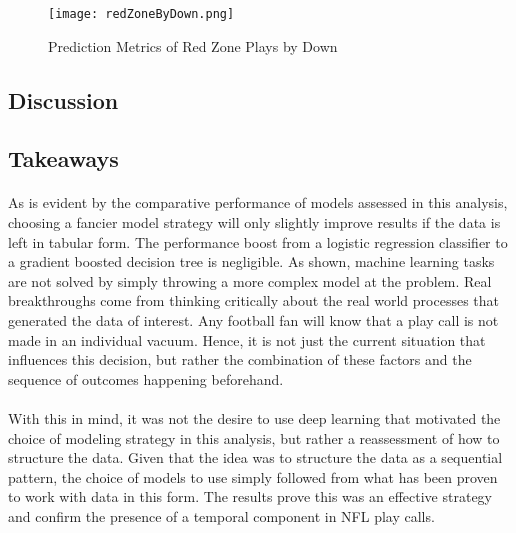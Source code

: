 \documentclass[11pt]{article}
\begin{document}
            \begin{figure}[ht]
                \texttt{[image: redZoneByDown.png]}
                \caption{Prediction Metrics of Red Zone Plays by Down}
                \label{fig:Prediction Metrics of Red Zone Plays by Down}
            \end{figure}
            \begin{multicols*}{2} 

    \section{Discussion}

        \subsection{Takeaways}

            \paragraph{}
                As is evident by the comparative performance of models assessed in this analysis, choosing a fancier model strategy will only slightly improve results if the data is left in tabular form.  
                The performance boost from a logistic regression classifier to a gradient boosted decision tree is negligible. 
                As shown, machine learning tasks are not solved by simply throwing a more complex model at the problem. 
                Real breakthroughs come from thinking critically about the real world processes that generated the data of interest. 
                Any football fan will know that a play call is not made in an individual vacuum. 
                Hence, it is not just the current situation that influences this decision, but rather the combination of these factors and the sequence of outcomes happening beforehand.   
                
            \vspace{-10pt}
            \paragraph{}
                With this in mind, it was not the desire to use deep learning that motivated the choice of modeling strategy in this analysis, but rather a reassessment of how to structure the data. 
                Given that the idea was to structure the data as a sequential pattern, the choice of models to use simply followed from what has been proven to work with data in this form. 
                The results prove this was an effective strategy and confirm the presence of a temporal component in NFL play calls.
                

\end{multicols*}
\end{document}
